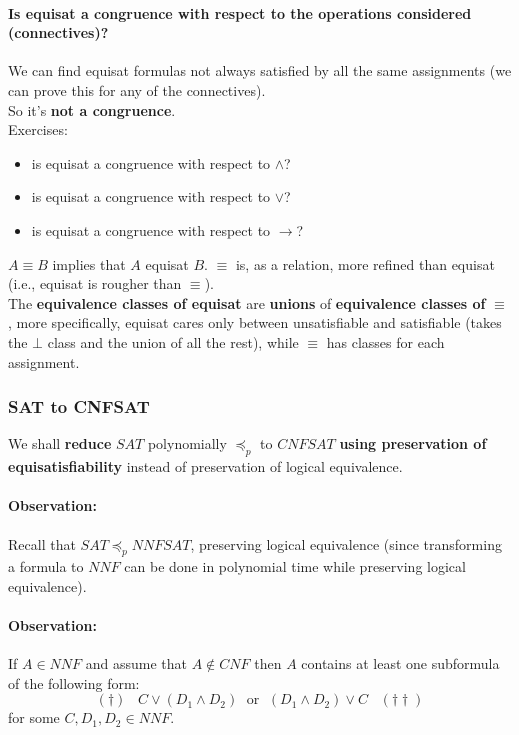 \documentclass[11pt]{article}
\begin{document}
	\paragraph{Is equisat a congruence with respect to the operations considered (connectives)?} We can find equisat formulas not always satisfied by all the same assignments (we can prove this for any of the connectives).\\
	So it's \textbf{not a congruence}.\\
	
	Exercises: 
	\begin{itemize}
		\item is equisat a congruence with respect to $\wedge$?
		\item is equisat a congruence with respect to $\vee$?
		\item is equisat a congruence with respect to $\rightarrow$?
	\end{itemize}
	
	$A \equiv B$ implies that $A$ equisat $B$. $\equiv$ is, as a relation, more refined than equisat (i.e., equisat is rougher than $\equiv$).\\
	
	The \textbf{equivalence classes of equisat} are \textbf{unions} of \textbf{equivalence classes of} $\equiv$, more specifically, equisat cares only between unsatisfiable and satisfiable (takes the $\bot$ class and the union of all the rest), while $\equiv$ has classes for each assignment.\\
	
	\newpage
	
	\subsubsection{SAT to CNFSAT}
	We shall \textbf{reduce} $SAT$ polynomially $\preceq_p$ to $CNFSAT$ \textbf{using preservation of equisatisfiability} instead of preservation of logical equivalence.\\
	
	\paragraph{Observation:} Recall that $SAT \preceq_p NNFSAT$, preserving logical equivalence (since transforming a formula to $NNF$ can be done in polynomial time while preserving logical equivalence).\\
	
	\paragraph{Observation:} If $A \in NNF$ and assume that $A \notin CNF$ then $A$ contains at least one subformula of the following form: 
	$$ (\dag) \;\;\; C \vee (D_1 \wedge D_2) \; \text{ or } \;  (D_1 \wedge D_2) \vee C \;\;\; (\dag \dag) $$
	for some $C, D_1, D_2 \in NNF$.\\
	
\end{document}
